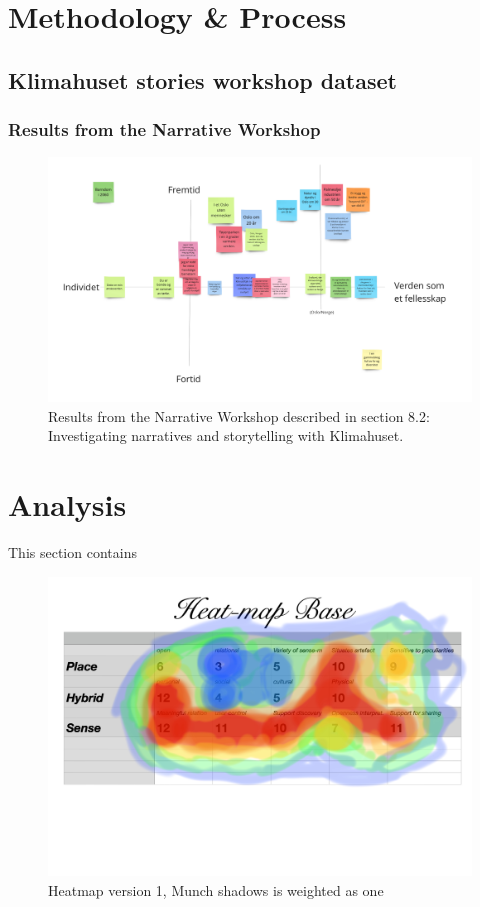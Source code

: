 \section{Methodology & Process}

\subsection{Klimahuset stories workshop dataset}


\subsubsection{Results from the Narrative Workshop}
\begin{figure}[H]
\includegraphics[width=12.5cm]{pictures/process/workshop_results.png}
\caption{Results from the Narrative Workshop described in section 8.2: Investigating narratives and storytelling with Klimahuset.}
\centering 
\end{figure}


\section{Analysis}
This section contains 

\begin{figure}[H]
\includegraphics[width=12.5cm]{pictures/dataset/heatmap.jpg}
\caption{Heatmap version 1, Munch shadows is weighted as one}
\end{figure}

